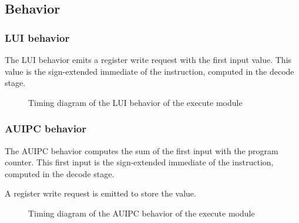 
  \subsection{Behavior}

    \subsubsection{LUI behavior}

      \begin{content}
          The LUI behavior emits a register write request with the first input value. This value is the sign-extended immediate of the instruction, computed in the decode stage.
        \end{content}

      \begin{figure}[H]
          \centering
          
          \caption{Timing diagram of the LUI behavior of the execute module}
          \label{fig:exm-behavior-lui}
        \end{figure}

    \subsubsection{AUIPC behavior}

      \begin{content}
          The AUIPC behavior computes the sum of the first input with the program counter. This first input is the sign-extended immediate of the instruction, computed in the decode stage.
          
          A register write request is emitted to store the value.
        \end{content}

      \begin{figure}[H]
          \centering
          
          \caption{Timing diagram of the AUIPC behavior of the execute module}
          \label{fig:exm-behavior-auipc}
        \end{figure}

